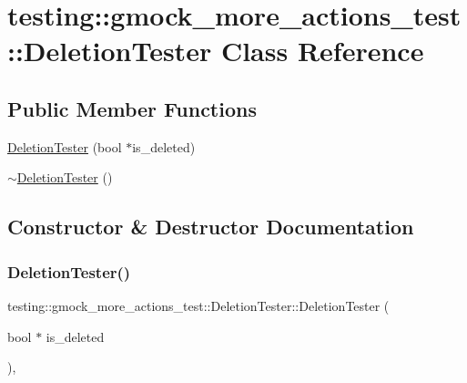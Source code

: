 \hypertarget{classtesting_1_1gmock__more__actions__test_1_1DeletionTester}{}\section{testing\+::gmock\+\_\+more\+\_\+actions\+\_\+test\+::Deletion\+Tester Class Reference}
\label{classtesting_1_1gmock__more__actions__test_1_1DeletionTester}
\subsection*{Public Member Functions}
\begin{DoxyCompactItemize}
\item 
\mbox{\hyperlink{classtesting_1_1gmock__more__actions__test_1_1DeletionTester_a3b9670fc6d29cb9d120fb0fdd2ba68d8}{Deletion\+Tester}} (bool $\ast$is\+\_\+deleted)
\item 
\mbox{\hyperlink{classtesting_1_1gmock__more__actions__test_1_1DeletionTester_ac79602dcb18df1747b086d7118e7e5f7}{$\sim$\+Deletion\+Tester}} ()
\end{DoxyCompactItemize}


\subsection{Constructor \& Destructor Documentation}
\mbox{\label{classtesting_1_1gmock__more__actions__test_1_1DeletionTester_a3b9670fc6d29cb9d120fb0fdd2ba68d8}} 
\subsubsection{\texorpdfstring{DeletionTester()}{DeletionTester()}}
{\footnotesize\ttfamily testing\+::gmock\+\_\+more\+\_\+actions\+\_\+test\+::\+Deletion\+Tester\+::\+Deletion\+Tester (\begin{DoxyParamCaption}\item[{bool $\ast$}]{is\+\_\+deleted }\end{DoxyParamCaption})\hspace{0.3cm}{\ttfamily [inline]}, {\ttfamily [explicit]}}

